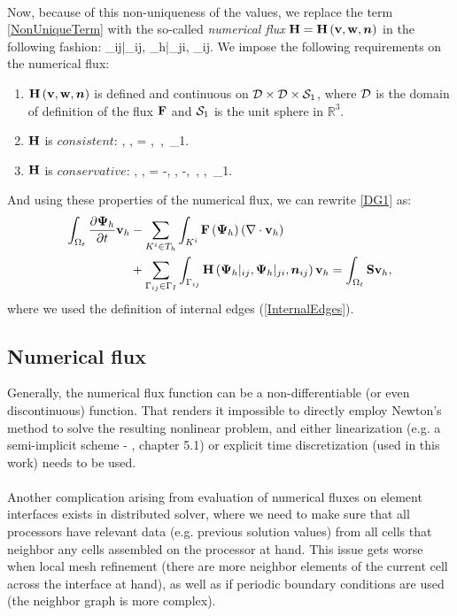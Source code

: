 \paragraph{}
Now, because of this non-uniqueness of the values, we replace the term \cref{NonUniqueTerm} with the so-called \textit{numerical flux} $\mathrm{\mathbf{H}} = \mathrm{\mathbf{H}}\left(\mathrm{\mathbf{v}}, \mathrm{\mathbf{w}}, \mbox{\boldmath $n$}\right)$ in the following fashion:
\be
\label{NumFluxDef}
\lo\mrF{}\ro \cdot \bfn_{ij}\ro \mrvh \approx \mrH{}|_{ij}, {\mrPsi_h}|_{ji}, \bfn_{ij}\ro \mrvh.
\ee
We impose the following requirements on the numerical flux:
\begin{enumerate}
	\item $\mathrm{\mathbf{H}}\left( \mathrm{\mathbf{v}}, \mathrm{\mathbf{w}}, \mbox{\boldmath $n$}\right)$ is defined and continuous on $\mathcal{D} \times \mathcal{D} \times \mathcal{S}_1$, where $\mathcal{D}$ is the domain of definition of the flux $\mathrm{\mathbf{F}}$ and $\mathcal{S}_1$ is the unit sphere in $\mathbb{R}^3$.
	\item $\mathrm{\mathbf{H}}$ is $consistent$:
		\be
			\label{FluxConsistent} \mrH\lo \mrv, \mrv, \bfn\ro = \mrF\lo \mrv\ro \bfn,\ \mrv\in{},\ \bfn\in{}_1.
		\ee
	\item $\mathrm{\mathbf{H}}$ is $conservative$:
		\be
			\label{FluxConservative} \mrH\lo \mrv, \mrw, \bfn\ro = -\mrH\lo \mrw, \mrv, -\bfn\ro,\ \mrv, \mrw\in{},\ \bfn\in{}_1.
		\ee
 \end{enumerate}

And using these properties of the numerical flux, we can rewrite \cref{DG1} as:
\begin{align}
    \label{DG2} \int_{\Omega_{t}} \frac{\partial{{\mathrm{\mathbf{\Psi}}_h}}}{\partial{t}} \mathrm{\mathbf{v}}_h & - \sum_{K^i \in T_h}\int_{K^i}\mathrm{\mathbf{F}}\left({\mathrm{\mathbf{\Psi}}_h}\right) \left(\nabla \cdot \mathrm{\mathbf{v}}_h\right)\\
    \nonumber & + \sum_{\Gamma_{ij}\in\Gamma_I} \int_{\Gamma_{ij}} \mathrm{\mathbf{H}}\left({\mathrm{\mathbf{\Psi}}_h}|_{ij}, {\mathrm{\mathbf{\Psi}}_h}|_{ji}, \mbox{\boldmath $n$}_{ij}\right) \mathrm{\mathbf{v}}_h = \int_{\Omega_{t}} \mathrm{\mathbf{S}} \mathrm{\mathbf{v}}_h,
\end{align}
where we used the definition of internal edges (\cref{InternalEdges}).
\subsection{Numerical flux}
Generally, the numerical flux function can be a non-differentiable (or even discontinuous) function. That renders it impossible to directly employ Newton's method to solve the resulting nonlinear problem, and either linearization (e.g. a semi-implicit scheme - \cite{dolejsi2015}, chapter 5.1) or explicit time discretization (used in this work) needs to be used.
\paragraph{}
Another complication arising from evaluation of numerical fluxes on element interfaces exists in distributed solver, where we need to make sure that all processors have relevant data (e.g. previous solution values) from all cells that neighbor any cells assembled on the processor at hand. This issue gets worse when local mesh refinement (there are more neighbor elements of the current cell across the interface at hand), as well as if periodic boundary conditions are used (the neighbor graph is more complex).

